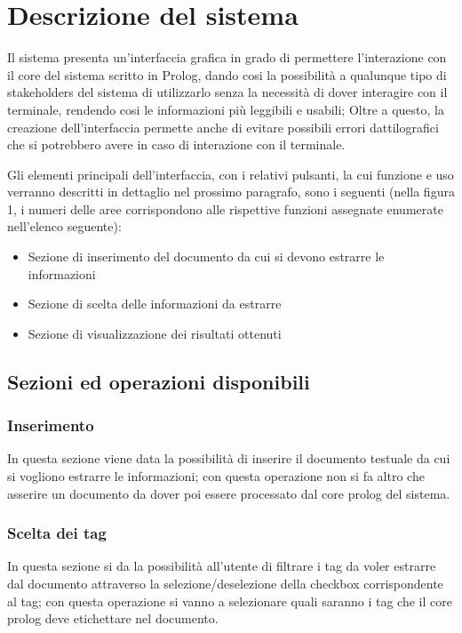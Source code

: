 \section{Descrizione del sistema}

Il sistema presenta un'interfaccia grafica in grado di permettere l'interazione con il core del sistema scritto in Prolog, dando cosi la possibilità a qualunque tipo di stakeholders del sistema di utilizzarlo senza la necessità di dover interagire con il terminale, rendendo cosi le informazioni più leggibili e usabili; Oltre a questo, la creazione dell'interfaccia permette anche di evitare possibili errori dattilografici che si potrebbero avere in caso di interazione con il terminale.

Gli elementi principali dell’interfaccia, con i relativi pulsanti, la cui funzione e uso verranno descritti in dettaglio nel prossimo paragrafo, sono i seguenti (nella figura 1, i numeri delle aree corrispondono alle rispettive funzioni assegnate enumerate
nell’elenco seguente):
\begin{itemize}
  \item Sezione di inserimento del documento da cui si devono estrarre le informazioni
  \item Sezione di scelta delle informazioni da estrarre
  \item Sezione di visualizzazione dei risultati ottenuti
\end{itemize}
\subsection{Sezioni ed operazioni disponibili}
    \subsubsection{Inserimento}
    \label{Inserimento}
    In questa sezione viene data la possibilità di inserire il documento testuale da cui si vogliono estrarre le informazioni; con questa operazione non si fa altro che asserire un documento da dover poi essere processato dal core prolog del sistema.
    \subsubsection{Scelta dei tag}
    \label{ChoiceTag}
    In questa sezione si da la possibilità all'utente di filtrare i tag da voler estrarre dal documento attraverso la selezione/deselezione della checkbox corrispondente al tag; con questa operazione si vanno a selezionare quali saranno i tag che il core prolog deve etichettare nel documento.
